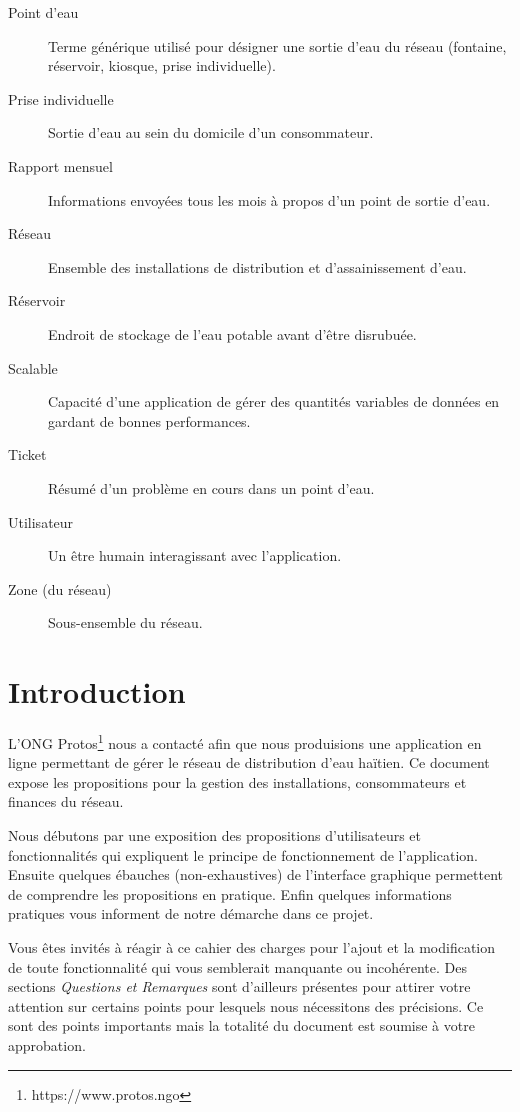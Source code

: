 \documentclass[a4paper, 11pt]{article}
\begin{document}
\begin{description}
    \item[Point d'eau] Terme générique utilisé pour désigner une sortie d'eau du réseau (fontaine, réservoir, kiosque, prise individuelle).
    \item[Prise individuelle] Sortie d'eau au sein du domicile d'un consommateur.
    \item[Rapport mensuel] Informations envoyées tous les mois à propos d'un point de sortie d'eau.
    \item[Réseau] Ensemble des installations de distribution et d'assainissement d'eau.
    \item[Réservoir] Endroit de stockage de l'eau potable avant d'être disrubuée.
    \item[Scalable] Capacité d'une application de gérer des quantités variables de données en gardant de bonnes performances.
    \item[Ticket] Résumé d'un problème en cours dans un point d'eau.
    \item[Utilisateur] Un être humain interagissant avec l'application.
    \item[Zone (du réseau)] Sous-ensemble du réseau.
  \end{description}
\section{Introduction}

L'ONG Protos\footnote{https://www.protos.ngo} nous a contacté afin que nous produisions une application en ligne permettant de gérer le réseau de distribution d'eau haïtien. Ce document expose les propositions pour la gestion des installations, consommateurs et finances du réseau.

Nous débutons par une exposition des propositions d'utilisateurs et fonctionnalités qui expliquent le principe de fonctionnement de l'application. Ensuite quelques ébauches (non-exhaustives) de l'interface graphique permettent de comprendre les propositions en pratique. Enfin quelques informations pratiques vous informent de notre démarche dans ce projet.

Vous êtes invités à réagir à ce cahier des charges pour l'ajout et la modification de toute fonctionnalité qui vous semblerait manquante ou incohérente. Des sections \emph{Questions et Remarques} sont d'ailleurs présentes pour attirer votre attention sur certains points pour lesquels nous nécessitons des précisions. Ce sont des points importants mais la totalité du document est soumise à votre approbation.
\end{document}
